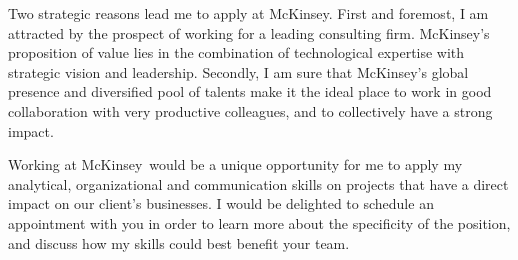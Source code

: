 \documentclass[11pt, a4paper]{awesome-cv}
\newcommand{\company}{McKinsey}
\begin{document}
\begin{cvletter}
Two strategic reasons lead me to apply at \company.    
First and foremost, I am attracted by the prospect of working for a leading consulting firm. 
\company's proposition of value lies in the combination of technological expertise with strategic vision and leadership. 
Secondly, I am sure that \company's global presence and diversified pool of talents make it the ideal place to work in good collaboration with very productive colleagues, and to collectively have a strong impact.  

Working at \company~would be a unique opportunity for me to apply my analytical, organizational and communication skills on projects that have a direct impact on our client's businesses. 
I would be delighted to schedule an appointment with you in order to learn more about the specificity of the position, and discuss how my skills could best benefit your team. 
\end{cvletter}


\makeletterclosing
\end{document}
